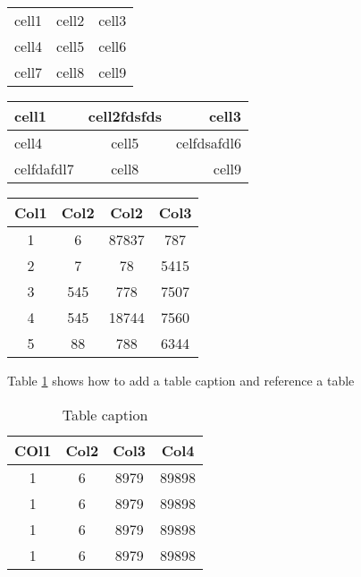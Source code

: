 \documentclass{book}
\begin{document}

\begin{center}
    \begin{tabular}{c c c} %
        cell1 & cell2 & cell3 \\
        cell4 & cell5 & cell6 \\
        cell7 & cell8 & cell9
    \end{tabular}
\end{center}

\begin{tabular}{l|c|r}
    \hline
    cell1      & cell2fdsfds & cell3       \\
    \hline
    cell4      & cell5       & celfdsafdl6 \\
    celfdafdl7 & cell8       & cell9       \\
    \hline
\end{tabular}

\begin{center}
    \begin{tabular}{||c c c c||}
        \hline
        Col1 & Col2 & Col2  & Col3 \\ [0.5ex]
        \hline\hline
        1    & 6    & 87837 & 787  \\
        \hline
        2    & 7    & 78    & 5415 \\
        \hline
        3    & 545  & 778   & 7507 \\
        \hline
        4    & 545  & 18744 & 7560 \\
        \hline
        5    & 88   & 788   & 6344 \\ [1ex]
        \hline
    \end{tabular}
\end{center}

Table \ref{tab:data} shows how to add a table caption and reference a table
\begin{table}[h]
    \centering
    \begin{tabular}{c c c c}
        \hline
        COl1 & Col2 & Col3 & Col4  \\ [0.5ex]
        \hline\hline
        1    & 6    & 8979 & 89898 \\
        1    & 6    & 8979 & 89898 \\
        1    & 6    & 8979 & 89898 \\
        1    & 6    & 8979 & 89898 \\ [1ex]
        \hline
    \end{tabular}
    \caption{Table caption}
    \label{tab:data}
\end{table}
\end{document}
